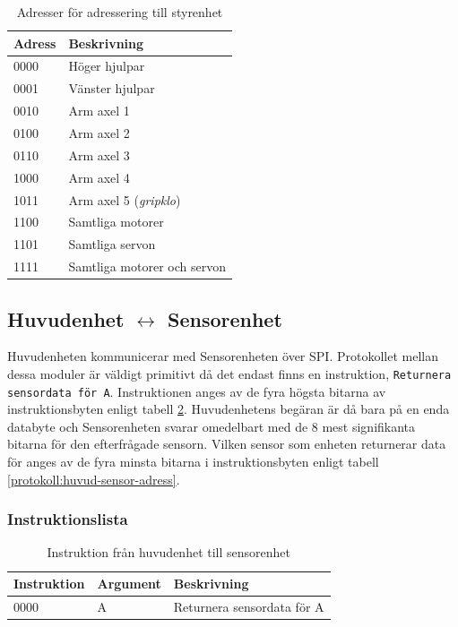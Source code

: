 \begin{table}[h!]
	\centering
	\begin{tabularx}{\textwidth}{| l | X |}
		\hline
		\textbf{Adress} & \textbf{Beskrivning} \\\hline
		{0000} & {Höger hjulpar} \\\hline
		{0001} & {Vänster hjulpar} \\\hline
		{0010} & {Arm axel 1} \\\hline
		{0100} & {Arm axel 2} \\\hline
		{0110} & {Arm axel 3} \\\hline
		{1000} & {Arm axel 4} \\\hline
		{1011} & {Arm axel 5 (\textit{gripklo})} \\\hline
		{1100} & {Samtliga motorer} \\\hline
		{1101} & {Samtliga servon} \\\hline
		{1111} & {Samtliga motorer och servon} \\\hline
	\end{tabularx}
	\caption{Adresser för adressering till styrenhet} \label{protokoll:pc-motor-adress-tabell}
\end{table}

\subsection{Huvudenhet $\longleftrightarrow$ Sensorenhet}

Huvudenheten kommunicerar med Sensorenheten över SPI. Protokollet mellan dessa moduler är väldigt primitivt då det endast finns en instruktion, \texttt{Returnera sensordata för A}. Instruktionen anges av de fyra högsta bitarna av instruktionsbyten enligt tabell \ref{protokoll:huvud-sensor}. Huvudenhetens begäran är då bara på en enda databyte och Sensorenheten svarar omedelbart med de 8 mest signifikanta bitarna för den efterfrågade sensorn. Vilken sensor som enheten returnerar data för anges av de fyra minsta bitarna i instruktionsbyten enligt tabell \ref{protokoll:huvud-sensor-adress}.


\subsubsection{Instruktionslista}

\begin{table}[h!]
	\centering
	\begin{tabularx}{\textwidth}{| l | l | X |}
		\hline
		\textbf{Instruktion} & \textbf{Argument} & \textbf{Beskrivning} \\\hline
		{0000} & {A} & {Returnera sensordata för A} \\\hline
	\end{tabularx}
	\caption{Instruktion från huvudenhet till sensorenhet} \label{protokoll:huvud-sensor}
\end{table}

